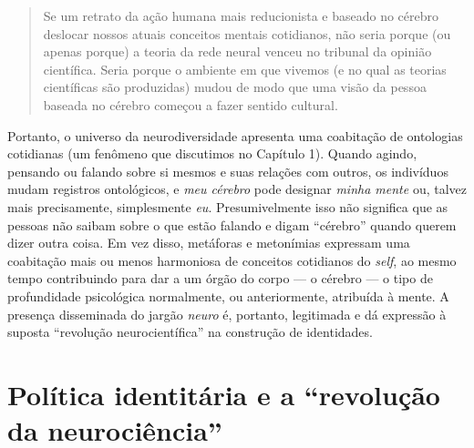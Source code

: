 \begin{quote}
Se um retrato da ação humana mais reducionista e baseado no cérebro
deslocar nossos atuais conceitos mentais cotidianos, não seria porque
(ou apenas porque) a teoria da rede neural venceu no tribunal da opinião
científica. Seria porque o ambiente em que vivemos (e no qual as teorias
científicas são produzidas) mudou de modo que uma visão da pessoa
baseada no cérebro começou a fazer sentido cultural.
\end{quote}

Portanto, o universo da neurodiversidade apresenta uma coabitação de
ontologias cotidianas (um fenômeno que discutimos no Capítulo 1). Quando
agindo, pensando ou falando sobre si mesmos e suas relações com outros,
os indivíduos mudam registros ontológicos, e \emph{meu cérebro} pode
designar \emph{minha mente} ou, talvez mais precisamente, simplesmente
\emph{eu}. Presumivelmente isso não significa que as pessoas não saibam
sobre o que estão falando e digam ``cérebro'' quando querem dizer outra
coisa. Em vez disso, metáforas e metonímias expressam uma coabitação
mais ou menos harmoniosa de conceitos cotidianos do \emph{self}, ao mesmo tempo
contribuindo para dar a um órgão do corpo --- o cérebro --- o tipo de
profundidade psicológica normalmente, ou anteriormente, atribuída à
mente. A presença disseminada do jargão \emph{neuro} é, portanto,
legitimada e dá expressão à suposta ``revolução neurocientífica'' na
construção de identidades.

\section*{Política identitária e a ``revolução da neurociência''}

